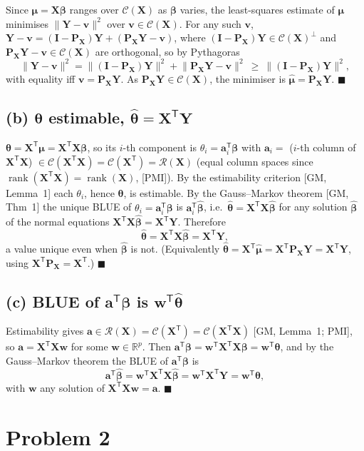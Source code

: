 \documentclass[11pt]{article}
\DeclareMathOperator{\rank}{rank}
\newcommand{\Cs}{\mathcal{C}}
\newcommand{\Rs}{\mathcal{R}}
\newcommand{\R}{\mathbb{R}}
\newcommand{\bX}{\mathbf{X}}
\newcommand{\bY}{\mathbf{Y}}
\newcommand{\bI}{\mathbf{I}}
\newcommand{\bP}{\mathbf{P}}
\newcommand{\bw}{\mathbf{w}}
\newcommand{\ba}{\mathbf{a}}
\newcommand{\bv}{\mathbf{v}}
\newcommand{\bbeta}{\bm{\beta}}
\newcommand{\btheta}{\bm{\theta}}
\newcommand{\bmu}{\bm{\mu}}
\newcommand{\T}{^{\mathsf{T}}}
\newcommand{\bhat}[1]{\widehat{#1}}
\theoremstyle{remark}
\begin{document}
Since $\bmu=\bX\bbeta$ ranges over $\Cs(\bX)$ as $\bbeta$ varies, the least-squares estimate of $\bmu$
minimises $\lVert\bY-\bv\rVert^2$ over $\bv\in\Cs(\bX)$. For any such $\bv$,
$\bY-\bv=(\bI-\bP_{\bX})\bY+(\bP_{\bX}\bY-\bv)$, where $(\bI-\bP_{\bX})\bY\in\Cs(\bX)^{\perp}$ and
$\bP_{\bX}\bY-\bv\in\Cs(\bX)$ are orthogonal, so by Pythagoras
\[
\lVert\bY-\bv\rVert^2=\lVert(\bI-\bP_{\bX})\bY\rVert^2+\lVert\bP_{\bX}\bY-\bv\rVert^2
\ \ge\ \lVert(\bI-\bP_{\bX})\bY\rVert^2,
\]
with equality iff $\bv=\bP_{\bX}\bY$. As $\bP_{\bX}\bY\in\Cs(\bX)$, the minimiser is
$\bhat{\bmu}=\bP_{\bX}\bY$. \hfill$\blacksquare$

\subsection*{(b) $\btheta$ estimable, $\bhat\btheta=\bX\T\bY$}

$\btheta=\bX\T\bmu=\bX\T\bX\bbeta$, so its $i$-th component is $\theta_i=\ba_i\T\bbeta$ with $\ba_i=$ ($i$-th
column of $\bX\T\bX$) $\in\Cs(\bX\T\bX)=\Cs(\bX\T)=\Rs(\bX)$ (equal column spaces since
$\rank(\bX\T\bX)=\rank(\bX)$, [PMI]). By the estimability criterion [GM, Lemma~1] each $\theta_i$, hence
$\btheta$, is estimable. By the Gauss--Markov theorem [GM, Thm~1] the unique BLUE of $\theta_i=\ba_i\T\bbeta$
is $\ba_i\T\bhat{\bbeta}$, i.e.\ $\bhat\btheta=\bX\T\bX\bhat{\bbeta}$ for any solution $\bhat{\bbeta}$ of the
normal equations $\bX\T\bX\bhat{\bbeta}=\bX\T\bY$. Therefore
\[
\bhat\btheta=\bX\T\bX\bhat{\bbeta}=\bX\T\bY,
\]
a value unique even when $\bhat{\bbeta}$ is not. (Equivalently
$\bhat\btheta=\bX\T\bhat{\bmu}=\bX\T\bP_{\bX}\bY=\bX\T\bY$, using $\bX\T\bP_{\bX}=\bX\T$.) \hfill$\blacksquare$

\subsection*{(c) BLUE of $\ba\T\bbeta$ is $\bw\T\bhat\btheta$}

Estimability gives $\ba\in\Rs(\bX)=\Cs(\bX\T)=\Cs(\bX\T\bX)$ [GM, Lemma~1; PMI], so $\ba=\bX\T\bX\bw$ for some
$\bw\in\R^p$. Then $\ba\T\bbeta=\bw\T\bX\T\bX\bbeta=\bw\T\btheta$, and by the Gauss--Markov theorem the BLUE
of $\ba\T\bbeta$ is
\[
\ba\T\bhat{\bbeta}=\bw\T\bX\T\bX\bhat{\bbeta}=\bw\T\bX\T\bY=\bw\T\bhat\btheta,
\]
with $\bw$ any solution of $\bX\T\bX\bw=\ba$. \hfill$\blacksquare$

\section*{Problem 2}
\end{document}
